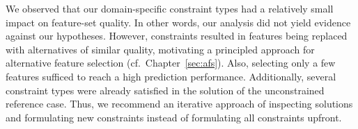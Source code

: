 We observed that our domain-specific constraint types had a relatively small impact on feature-set quality.
In other words, our analysis did not yield evidence against our hypotheses.
However, constraints resulted in features being replaced with alternatives of similar quality, motivating a principled approach for alternative feature selection (cf.~Chapter~\ref{sec:afs}).
Also, selecting only a few features sufficed to reach a high prediction performance.
Additionally, several constraint types were already satisfied in the solution of the unconstrained reference case.
Thus, we recommend an iterative approach of inspecting solutions and formulating new constraints instead of formulating all constraints upfront.
